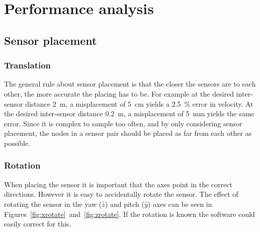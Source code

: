 \cleardoublepage\chapter{Performance analysis}\label{chap:performance}
\section{Sensor placement}
\subsection{Translation}
The general rule about sensor placement is that the closer the sensors are to each other, the more accurate the placing has to be. For example at the desired inter-sensor distance 2~m, a misplacement of 5~cm yields a 2.5~\% error in velocity. At the desired inter-sensor distance 0.2~m, a misplacement of 5~mm yields the same error. Since it is complex to sample too often, and by only considering sensor placement, the nodes in a sensor pair should be placed as far from each other as possible.

\subsection{Rotation}

When placing the sensor it is important that the axes point in the correct directions. However it is easy to accidentally rotate the sensor. The effect of rotating the sensor in the yaw ($\hat{z}$) and pitch ($\hat{y}$) axes can be seen in \mbox{Figures \ref{fig:xrotate} and \ref{fig:zrotate}.} If the rotation is known the software could easily correct for this.

